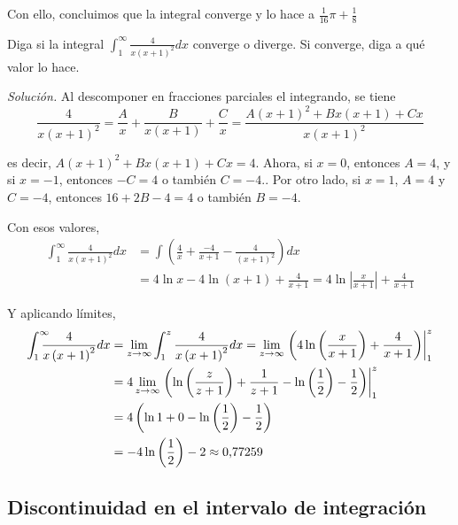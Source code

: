 Con ello, concluimos que la integral converge y lo hace a $\frac{1}{16}\pi +\frac{1}{8}$

\begin{ejemplo}
\textnormal{Diga si la integral {\small \textit{$\displaystyle \int_{1}^{\infty }\frac{4}{x\left( x+1\right) ^{2}}dx$}} converge o diverge. Si converge, diga a qué valor lo hace.}
\end{ejemplo}


\textit{Solución.} Al descomponer en fracciones parciales el integrando, se tiene
{\small
\[
\frac{4}{x\left( x+1\right)^{2}}=\frac{A}{x}+\frac{B}{x\left( x+1\right) }+\frac{C}{x}=\frac{A\left( x+1\right) ^{2}+Bx\left( x+1\right) +Cx}{x\left(
x+1\right) ^{2}}
\]
}


es decir, $A\left( x+1\right) ^{2}+Bx\left( x+1\right) +Cx=4$. Ahora, si $x=0$, entonces $A=4$, y si $x=-1$, entonces $-C=4$ o también $C=-4.$. Por otro lado, si $x=1$, $A=4$ y $C=-4$, entonces $16+2B-4=4$ o también $B=-4.$

Con esos valores,
{\small
\begin{align*}
\int_{1}^{\infty }\frac{4}{x\left( x+1\right) ^{2}}dx&=\int \left( \frac{4}{x}+\frac{-4}{x+1}-\frac{4}{\left( x+1\right) ^{2}}\right) dx\\
&=4\ln x-4\ln \left( x+1\right) +\frac{4}{x+1}=4\ln \left\vert \frac{x}{x+1}\right\vert +\frac{4}{x+1}
\end{align*}
}

Y aplicando límites,
{\small
\begin{align*}
\int_{1}^{\infty }\hspace{-0.3cm}\frac{4}{x\left( x+1\right) ^{2}}dx&=\lim_{z\rightarrow
\infty }\int_{1}^{z}\frac{4}{x\left( x+1\right) ^{2}}dx=\lim_{z\to
\infty }\left.\left( 4\ln \left( \frac{x}{x+1}\right) +\frac{4}{x+1}\right)
\right\vert_{1}^{z}\\
&=4\lim_{z\rightarrow \infty }\left.\left( \ln \left( \frac{z}{z+1}\right) +\frac{1}{z+1}-\ln \left( \frac{1}{2}\right) -\frac{1}{2}\right)\right\vert_{1}^{z}\\
&=4\left(\ln 1+0-\ln \left( \frac{1}{2}\right) -\frac{1}{2}\right) \\
&=-4\ln \left( \frac{1}{2}\right) -2\approx0\text{,}77259
\end{align*}
}

\subsection*{Discontinuidad en el intervalo de integración}


